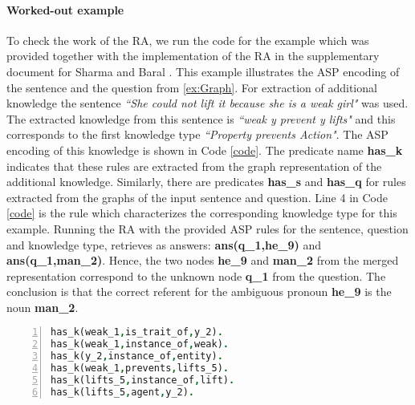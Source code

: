 \paragraph{Worked-out example} To check the work of the RA, we run the code for the example which was provided together with the implementation of the RA in the supplementary document for Sharma and Baral \cite{2018CommonsenseKT}. This example illustrates the ASP encoding of the sentence and the question from \ref{ex:Graph}.
For extraction of additional knowledge the sentence \textit{``She could not lift it because she is a weak girl"} was used. The extracted knowledge from this sentence is \textit{``weak y prevent y lifts"} and this corresponds to the first knowledge type \textit{``Property prevents Action"}. The ASP encoding of this knowledge is shown in Code \ref{code}. The predicate name \textbf{has\_k} indicates that these rules are extracted from the graph representation of the additional knowledge. Similarly, there are predicates \textbf{has\_s} and \textbf{has\_q} for rules extracted from the graphs of the input sentence and question. Line 4 in Code \ref{code} is the rule which characterizes the corresponding knowledge type for this example. Running the RA with the provided ASP rules for the sentence, question and knowledge type, retrieves as answers: \textbf{ans(q\_1,he\_9)} and \textbf{ans(q\_1,man\_2)}. Hence, the two nodes \textbf{he\_9} and \textbf{man\_2} from the merged representation correspond to the unknown node \textbf{q\_1} from the question. The conclusion is that the correct referent for the ambiguous pronoun \textbf{he\_9} is the noun \textbf{man\_2}. \\
\begin{lstlisting}[language = Prolog, style=SC, caption={``weak y prevents y lifts"},label=code,numbers=left,
numberstyle=\tiny ]
has_k(weak_1,is_trait_of,y_2).
has_k(weak_1,instance_of,weak).
has_k(y_2,instance_of,entity).
has_k(weak_1,prevents,lifts_5).
has_k(lifts_5,instance_of,lift).
has_k(lifts_5,agent,y_2).
\end{lstlisting}

\pagebreak

